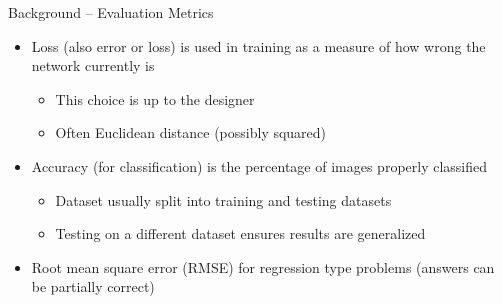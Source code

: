 \documentclass{beamer}
\begin{document}
	\begin{frame}{Background -- Evaluation Metrics}
	\begin{itemize}
		\item Loss (also error or loss) is used in training as a measure of how wrong the network currently is
		\begin{itemize}
			\item This choice is up to the designer
			\item Often Euclidean distance (possibly squared)
		\end{itemize}
		\item Accuracy (for classification) is the percentage of images properly classified
		\begin{itemize}
			\item Dataset usually split into training and testing datasets
			\item Testing on a different dataset ensures results are generalized
		\end{itemize}
		\item Root mean square error (RMSE) for regression type problems (answers can be partially correct)
	\end{itemize}
	\end{frame}
\end{document}
